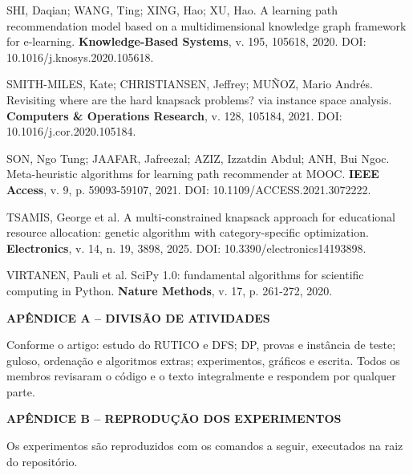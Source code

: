 \documentclass[12pt,a4paper]{article}
\begin{document}
\begin{singlespace}
\noindent SHI, Daqian; WANG, Ting; XING, Hao; XU, Hao. A learning path recommendation model based on a multidimensional knowledge graph framework for e-learning. \textbf{Knowledge-Based Systems}, v. 195, 105618, 2020. DOI: 10.1016/j.knosys.2020.105618.\par\vspace{1em}
\noindent SMITH-MILES, Kate; CHRISTIANSEN, Jeffrey; MUÑOZ, Mario Andrés. Revisiting where are the hard knapsack problems? via instance space analysis. \textbf{Computers \& Operations Research}, v. 128, 105184, 2021. DOI: 10.1016/j.cor.2020.105184.\par\vspace{1em}
\noindent SON, Ngo Tung; JAAFAR, Jafreezal; AZIZ, Izzatdin Abdul; ANH, Bui Ngoc. Meta-heuristic algorithms for learning path recommender at MOOC. \textbf{IEEE Access}, v. 9, p. 59093-59107, 2021. DOI: 10.1109/ACCESS.2021.3072222.\par\vspace{1em}
\noindent TSAMIS, George et al. A multi-constrained knapsack approach for educational resource allocation: genetic algorithm with category-specific optimization. \textbf{Electronics}, v. 14, n. 19, 3898, 2025. DOI: 10.3390/electronics14193898.\par\vspace{1em}
\noindent VIRTANEN, Pauli et al. SciPy 1.0: fundamental algorithms for scientific computing in Python. \textbf{Nature Methods}, v. 17, p. 261-272, 2020.\par\vspace{1em}
\end{singlespace}
\clearpage
\begin{center}{\bfseries APÊNDICE A -- DIVISÃO DE ATIVIDADES}\end{center}\vspace{0.5em}
Conforme o artigo: estudo do RUTICO e DFS; DP, provas e instância de teste; guloso, ordenação e algoritmos extras; experimentos, gráficos e escrita. Todos os membros revisaram o código e o texto integralmente e respondem por qualquer parte.

\clearpage
\begin{center}{\bfseries APÊNDICE B -- REPRODUÇÃO DOS EXPERIMENTOS}\end{center}\vspace{0.5em}
Os experimentos são reproduzidos com os comandos a seguir, executados na raiz do repositório.
\end{document}
